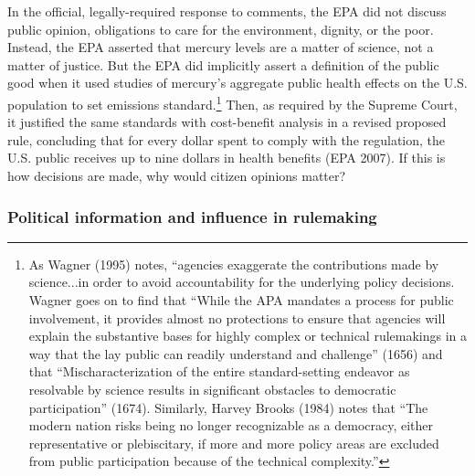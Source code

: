 In the official, legally-required response to comments, the EPA did not discuss public opinion, obligations to care for the environment, dignity, or the poor. Instead, the EPA asserted that mercury levels are a matter of science, not a matter of justice. But the EPA did implicitly assert a definition of the public good when it used studies of mercury's aggregate public health effects on the U.S. population to set emissions standard.\footnote{As Wagner (1995) %
notes, ``agencies exaggerate the contributions made by science...in order to avoid accountability for the underlying policy decisions. %
Wagner goes on to find that  ``While the APA mandates a process for public involvement, it provides almost no protections to ensure that agencies will explain the substantive bases for highly complex or technical rulemakings in a way that the lay public can readily understand and challenge'' (1656) and that ``Mischaracterization of the entire standard-setting endeavor as resolvable by science results in significant obstacles to democratic participation'' (1674). Similarly, Harvey Brooks (1984) %
notes that ``The modern nation risks being no longer recognizable as a democracy, either representative or plebiscitary, if more and more policy areas are excluded from public participation because of the technical complexity.''} 
Then, as required by the Supreme Court, it justified the same standards with cost-benefit analysis in a revised proposed rule, concluding that for every dollar spent to comply with the regulation, the U.S. public receives up to nine dollars in health benefits (EPA 2007). If this is how decisions are made, %
why would citizen opinions matter? %

\subsubsection{Political information and influence in rulemaking}

